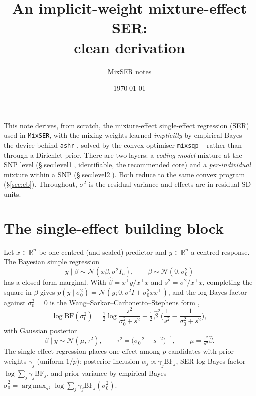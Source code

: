 \documentclass[11pt]{article}
\title{\bf An implicit-weight mixture-effect SER:\\ clean derivation}
\author{MixSER notes}
\date{\today}
\newcommand{\N}{\mathcal{N}}
\newcommand{\R}{\mathbb{R}}
\newcommand{\BF}{\mathrm{BF}}
\DeclareMathOperator*{\argmax}{arg\,max}
\begin{document}
\maketitle

\noindent
This note derives, from scratch, the mixture-effect single-effect regression
(SER) used in \texttt{MixSER}, with the mixing weights learned \emph{implicitly}
by empirical Bayes -- the device behind \texttt{ashr} \citep{stephens2017},
solved by the convex optimiser \texttt{mixsqp} \citep{kim2020} -- rather than
through a Dirichlet prior. There are two layers: a \emph{coding-model} mixture at
the SNP level (\S\ref{sec:level1}, identifiable, the recommended core) and a
\emph{per-individual} mixture within a SNP (\S\ref{sec:level2}). Both reduce to
the same convex program (\S\ref{sec:eb}). Throughout, $\sigma^2$ is the residual
variance and effects are in residual-SD units.

\section{The single-effect building block}
\label{sec:ser}
Let $x\in\R^n$ be one centred (and scaled) predictor and $y\in\R^n$ a centred
response. The Bayesian simple regression
\begin{equation}
y \mid \beta \sim \N(x\beta,\sigma^2 I_n),\qquad \beta \sim \N(0,\sigma_0^2)
\label{eq:simple}
\end{equation}
has a closed-form marginal. With $\hat\beta = x^\top y/x^\top x$ and
$s^2 = \sigma^2/x^\top x$, completing the square in $\beta$ gives
$p(y\mid\sigma_0^2)=\N(y;0,\sigma^2 I + \sigma_0^2 x x^\top)$, and the log Bayes
factor against $\sigma_0^2=0$ is the Wang--Sarkar--Carbonetto--Stephens form
\citep{wang2020},
\begin{equation}
\log\BF(\sigma_0^2)
= \tfrac12\log\frac{s^2}{\sigma_0^2+s^2}
   + \tfrac12\,\hat\beta^2\Big(\frac{1}{s^2}-\frac{1}{\sigma_0^2+s^2}\Big),
\label{eq:lbf}
\end{equation}
with Gaussian posterior
\begin{equation}
\beta\mid y \sim \N(\mu,\tau^2),\qquad
\tau^2=\big(\sigma_0^{-2}+s^{-2}\big)^{-1},\qquad
\mu=\tfrac{\tau^2}{s^2}\hat\beta .
\label{eq:postbeta}
\end{equation}
The single-effect regression \citep{wang2020} places one effect among $p$
candidates with prior weights $\gamma_j$ (uniform $1/p$): posterior inclusion
$\alpha_j \propto \gamma_j\BF_j$, SER log Bayes factor $\log\sum_j\gamma_j\BF_j$,
and prior variance by empirical Bayes
$\hat\sigma_0^2=\argmax_{\sigma_0^2}\log\sum_j\gamma_j\BF_j(\sigma_0^2)$.
\end{document}
